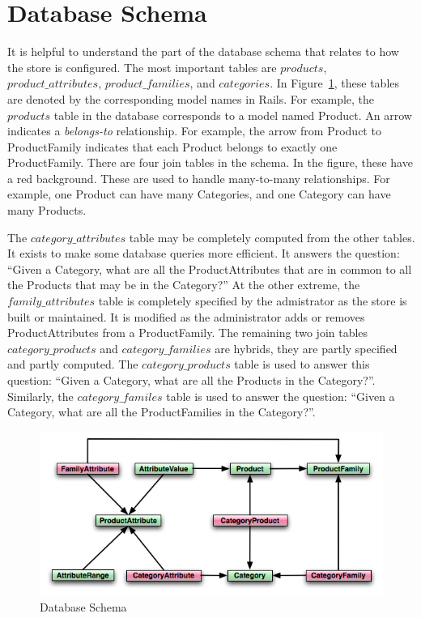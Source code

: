 \documentclass[letterpaper, 12pt]{article}
\begin{document}
\section{Database Schema}
It is helpful to understand the part of the database schema that relates to how the store is configured.  The most important tables are $products$, $product\_attributes$, $product\_families$, and $categories$.  In Figure~\ref{schema02}, these tables are denoted by the corresponding model names in Rails.  For example, the $products$ table in the database corresponds to a model named Product.  An arrow indicates a \emph{belongs-to} relationship.  For example, the arrow from Product to ProductFamily indicates that each Product belongs to exactly one ProductFamily.  There are four join tables in the schema.  In the figure, these have a red background.  These are used to handle many-to-many relationships.  For example, one Product can have many Categories, and one Category can have many Products.  
\par
The $category\_attributes$ table may be completely computed from the other tables.  It exists to make some database queries more efficient.  It answers the question: ``Given a Category, what are all the ProductAttributes that are in common to all the Products that may be in the Category?''  At the other extreme, the $family\_attributes$ table is completely specified by the admistrator as the store is built or maintained.  It is modified as the administrator adds or removes ProductAttributes from a ProductFamily.  The remaining two join tables $category\_products$ and $category\_families$ are hybrids, they are partly specified and partly computed.  The $category\_products$ table is used to answer this question: ``Given a Category, what are all the Products in the Category?''.  Similarly, the $category\_familes$ table is used to answer the question: ``Given a Category, what are all the ProductFamilies in the Category?''.  


\begin{figure}
\includegraphics[scale=0.9]{schema}
\caption{\label{schema02}Database Schema}
\end{figure}


\end{document}
